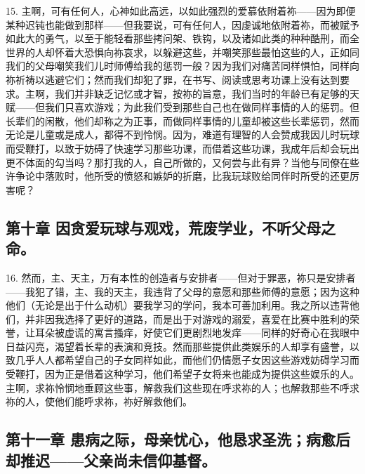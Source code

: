 15. 主啊，可有任何人，心神如此高远，以如此强烈的爱慕依附着祢——因为即便某种迟钝也能做到那样——但我要说，可有任何人，因虔诚地依附着祢，而被赋予如此大的勇气，以至于能轻看那些拷问架、铁钩，以及诸如此类的种种酷刑，而全世界的人却怀着大恐惧向祢哀求，以躲避这些，并嘲笑那些最怕这些的人，正如同我们的父母嘲笑我们儿时师傅给我的惩罚一般？因为我们对痛苦同样惧怕，同样向祢祈祷以逃避它们；然而我们却犯了罪，在书写、阅读或思考功课上没有达到要求。主啊，我们并非缺乏记忆或才智，按祢的旨意，我们当时的年龄已有足够的天赋——但我们只喜欢游戏；为此我们受到那些自己也在做同样事情的人的惩罚。但长辈们的闲散，他们却称之为正事，而做同样事情的儿童却被这些长辈惩罚，然而无论是儿童或是成人，都得不到怜悯。因为，难道有理智的人会赞成我因儿时玩球而受鞭打，以致于妨碍了快速学习那些功课，而借着这些功课，我成年后却会玩出更不体面的勾当吗？那打我的人，自己所做的，又何尝与此有异？当他与同僚在些许争论中落败时，他所受的愤怒和嫉妒的折磨，比我玩球败给同伴时所受的还更厉害呢？\par


\subsection{第十章 因贪爱玩球与观戏，荒废学业，不听父母之命。}

16. 然而，主、天主，万有本性的创造者与安排者——但对于罪恶，祢只是安排者——我犯了错，主、我的天主，我违背了父母的意愿和那些师傅的意愿；因为这种他们（无论是出于什么动机）要我学习的学问，我本可善加利用。我之所以违背他们，并非因我选择了更好的道路，而是出于对游戏的溺爱，喜爱在比赛中胜利的荣誉，让耳朵被虚谎的寓言搔痒，好使它们更剧烈地发痒——同样的好奇心在我眼中日益闪亮，渴望着长辈的表演和竞技。然而那些提供此类娱乐的人却享有盛誉，以致几乎人人都希望自己的子女同样如此，而他们仍情愿子女因这些游戏妨碍学习而受鞭打，因为正是借着这种学习，他们希望子女将来也能成为提供这些娱乐的人。主啊，求祢怜悯地垂顾这些事，解救我们这些现在呼求祢的人；也解救那些不呼求祢的人，使他们能呼求祢，祢好解救他们。\par


\subsection{第十一章 患病之际，母亲忧心，他恳求圣洗；病愈后却推迟——父亲尚未信仰基督。}

